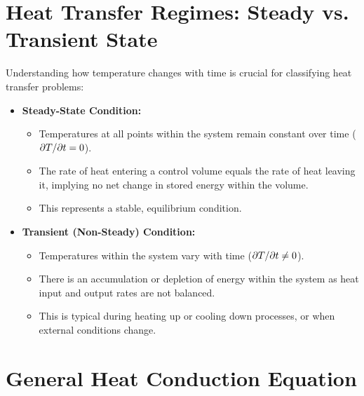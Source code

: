 \section{Heat Transfer Regimes: Steady vs. Transient State}

Understanding how temperature changes with time is crucial for classifying heat transfer problems:
\begin{itemize}
    \item \textbf{Steady-State Condition:}
        \begin{itemize}
            \item Temperatures at all points within the system remain constant over time ($\partial T / \partial t = 0$).
            \item The rate of heat entering a control volume equals the rate of heat leaving it, implying no net change in stored energy within the volume.
            \item This represents a stable, equilibrium condition.
        \end{itemize}
    \item \textbf{Transient (Non-Steady) Condition:}
        \begin{itemize}
            \item Temperatures within the system vary with time ($\partial T / \partial t \neq 0$).
            \item There is an accumulation or depletion of energy within the system as heat input and output rates are not balanced.
            \item This is typical during heating up or cooling down processes, or when external conditions change.
        \end{itemize}
\end{itemize}

\section{General Heat Conduction Equation}

